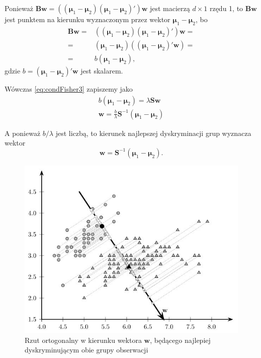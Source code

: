 \documentclass[
]{book}
\theoremstyle{plain}
\theoremstyle{definition}
\theoremstyle{definition}
\theoremstyle{definition}
\theoremstyle{definition}
\theoremstyle{remark}
\begin{document}
Ponieważ \(\boldsymbol{B}\boldsymbol w=\left((\boldsymbol{\mu}_1-\boldsymbol{\mu}_2)(\boldsymbol{\mu}_1-\boldsymbol{\mu}_2)'\right)\boldsymbol{w}\) jest macierzą \(d \times 1\) rzędu 1, to \(\boldsymbol{B}\boldsymbol{w}\) jest punktem na kierunku wyznaczonym przez wektor \(\boldsymbol{\mu}_1-\boldsymbol{\mu}_2\), bo
\begin{align}
    \boldsymbol{B}\boldsymbol{w}=& \left((\boldsymbol{\mu}_1-\boldsymbol{\mu}_2)(\boldsymbol{\mu}_1-\boldsymbol{\mu}_2)'\right)\boldsymbol{w}=\\
    =&(\boldsymbol{\mu}_1-\boldsymbol{\mu}_2)((\boldsymbol{\mu}_1-\boldsymbol{\mu}_2)'\boldsymbol{w})=\\
    =& b(\boldsymbol{\mu}_1-\boldsymbol{\mu}_2),
\end{align}
gdzie \(b = (\boldsymbol{\mu}_1-\boldsymbol{\mu}_2)'\boldsymbol{w}\) jest skalarem.

Wówczas \eqref{eq:condFisher3} zapiszemy jako
\begin{gather}
    b(\boldsymbol{\mu}_1-\boldsymbol{\mu}_2) = \lambda\boldsymbol{S}\boldsymbol{w}\\
    \boldsymbol{w}= \frac{b}{\lambda}\boldsymbol{S}^{-1}(\boldsymbol{\mu}_1-\boldsymbol{\mu}_2)
\end{gather}

A ponieważ \(b/\lambda\) jest liczbą, to kierunek najlepszej dyskryminacji grup wyznacza wektor
\begin{equation}
    \boldsymbol{w}=\boldsymbol{S}^{-1}(\boldsymbol{\mu}_1-\boldsymbol{\mu}_2).
\end{equation}

\begin{figure}

{\centering \includegraphics[width=6.02in]{images/rzut2} 

}

\caption{Rzut ortogonalny w kierunku wektora $\boldsymbol{w}$, będącego najlepiej dyskryminującym obie grupy obserwacji}\label{fig:rzut2}
\end{figure}
\end{document}
